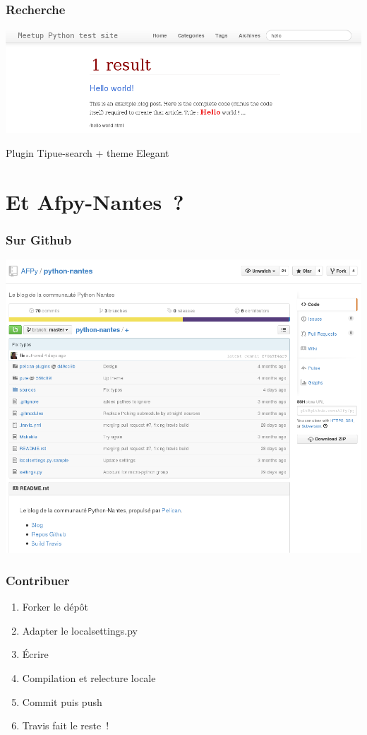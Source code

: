 \documentclass[frenchb,francais]{beamer}
\begin{document}
\begin{frame}
    \frametitle{Recherche}
    \begin{center}\includegraphics[scale=.20]{img/search.png}\end{center}
    Plugin Tipue-search + theme Elegant
\end{frame}

\section{Et Afpy-Nantes ?}

\begin{frame}
    \frametitle{Sur Github}
    \begin{center}\includegraphics[scale=.20]{img/github.png}\end{center}
\end{frame}

\begin{frame}
    \frametitle{Contribuer}
    \begin{enumerate}
        \item Forker le dépôt
        \item Adapter le localsettings.py
        \item Écrire
        \item Compilation et relecture locale
        \item Commit puis push
        \item Travis fait le reste !
    \end{enumerate}
\end{frame}
\end{document}
